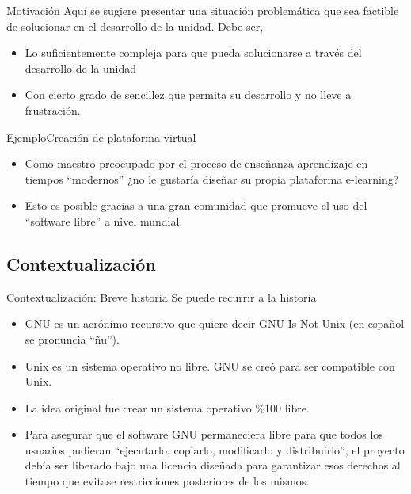 \documentclass{beamer}
\begin{document}
\begin{frame}{Motivación}
Aquí se sugiere presentar una situación problemática que sea factible de solucionar en el desarrollo de la unidad. Debe ser,
\begin{itemize}
  \item Lo suficientemente compleja para que pueda solucionarse a través del desarrollo de la unidad
    \pause
  \item Con cierto grado de sencillez que permita su desarrollo y no lleve a frustración.
\end{itemize}
\end{frame}

\begin{frame}{Ejemplo}{Creación de plataforma virtual}
\begin{itemize}
  \item Como maestro preocupado por el proceso de enseñanza-aprendizaje en tiempos ``modernos'' ¿no le gustaría diseñar su propia plataforma e-learning?
  \pause
  \item Esto es posible gracias a una gran comunidad que promueve el uso del ``software libre'' a nivel mundial.
\end{itemize}
\end{frame}
\subsection{Contextualización}
\begin{frame}{Contextualización: Breve historia}
Se puede recurrir a la historia
\begin{itemize}
\item GNU es un acrónimo recursivo que quiere decir GNU Is Not Unix (en español se pronuncia ``ñu'').
\pause
\item Unix es un sistema operativo no libre. GNU se creó para ser compatible con Unix.
\pause
\item La idea original fue crear un sistema operativo \%100 libre.
\pause
\item Para asegurar que el software GNU permaneciera libre para que todos los usuarios pudieran ``ejecutarlo, copiarlo, modificarlo y distribuirlo'', el proyecto debía ser liberado bajo una licencia diseñada para garantizar esos derechos al tiempo que evitase restricciones posteriores de los mismos.
\end{itemize}
\end{frame}
\end{document}
